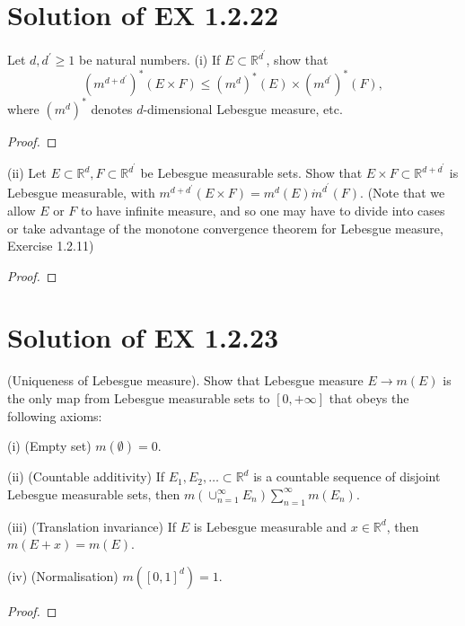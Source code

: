 \documentclass[reqno,a4paper,14pt]{amsart}
\begin{document}
\section{Solution of EX 1.2.22}
Let $d,d^\prime\geq 1$ be natural numbers. (i) If $E\subset \mathbb{R}^{d^\prime}$, show that 
\begin{equation*}
    (m^{d+d^\prime})^*(E\times F)\leq (m^d)^*(E)\times (m^{d^\prime})^*(F),
\end{equation*}
where $(m^d)^*$ denotes $d$-dimensional Lebesgue measure, etc.
\begin{proof}
    
\end{proof}
(ii) Let $E\subset \mathbb{R}^d, F\subset \mathbb{R}^{d^\prime}$ be Lebesgue measurable sets. Show that $E\times F\subset \mathbb{R}^{d+d^\prime}$ is Lebesgue measurable, with $m^{d+d^\prime}(E\times F)=m^d(E) \dot m^{d^\prime}(F)$. (Note that we allow $E$ or $F$ to have infinite measure, and so one may have to divide into cases or take advantage of the monotone convergence theorem for Lebesgue measure, Exercise 1.2.11)
\begin{proof}
    
\end{proof}


\section{Solution of EX 1.2.23}
(Uniqueness of Lebesgue measure). Show that Lebesgue measure $E\to m(E)$ is the only map from Lebesgue measurable sets to $[0,+\infty]$ that obeys the following axioms:

(i) (Empty set) $m(\emptyset) =0$.

(ii) (Countable additivity) If $E_1,E_2,\dots \subset \mathbb{R}^d$ is a countable sequence of disjoint Lebesgue measurable sets, then $m(\cup_{n=1}^\infty E_n)\sum_{n=1}^\infty m(E_n)$.

(iii) (Translation invariance) If $E$ is Lebesgue measurable and $x\in \mathbb{R}^d$, then $m(E+x)=m(E)$.

(iv) (Normalisation) $m([0,1]^d)=1$.
\begin{proof}
    
\end{proof}
\end{document}
